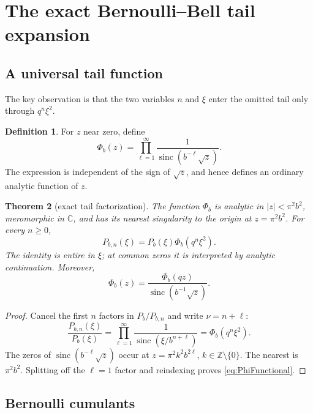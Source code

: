 \documentclass[11pt]{article}
\newtheorem{theorem}{Theorem}[section]
\theoremstyle{definition}
\newtheorem{definition}[theorem]{Definition}
\theoremstyle{remark}
\newcommand{\sinc}{\operatorname{sinc}}
\newcommand{\C}{\mathbb{C}}
\newcommand{\abs}[1]{\left\lvert #1\right\rvert}
\begin{document}
\section{The exact Bernoulli--Bell tail expansion}
\label{sec:tail}

\subsection{A universal tail function}

The key observation is that the two variables \(n\) and \(\xi\) enter the omitted
tail only through \(q^n\xi^2\).

\begin{definition}
For \(z\) near zero, define
\begin{equation}
 \Phi_b(z)=\prod_{\ell=1}^{\infty}
 \frac1{\sinc(b^{-\ell}\sqrt z)}.
 \label{eq:PhiDef}
\end{equation}
The expression is independent of the sign of \(\sqrt z\), and hence defines an
ordinary analytic function of \(z\).
\end{definition}

\begin{theorem}[exact tail factorization]
\label{thm:tailfactor}
The function \(\Phi_b\) is analytic in \(\abs z<\pi^2b^2\), meromorphic in
\(\C\), and has its nearest singularity to the origin at \(z=\pi^2b^2\). For
every \(n\geq0\),
\begin{equation}
 P_{b,n}(\xi)=P_b(\xi)\Phi_b(q^n\xi^2).
 \label{eq:exacttail}
\end{equation}
The identity is entire in \(\xi\); at common zeros it is interpreted by analytic
continuation. Moreover,
\begin{equation}
 \Phi_b(z)=\frac{\Phi_b(qz)}{\sinc(b^{-1}\sqrt z)}.
 \label{eq:PhiFunctional}
\end{equation}
\end{theorem}

\begin{proof}
Cancel the first \(n\) factors in \(P_b/P_{b,n}\) and write \(\nu=n+\ell\):
\[
 \frac{P_{b,n}(\xi)}{P_b(\xi)}
 =\prod_{\ell=1}^{\infty}
 \frac1{\sinc(\xi/b^{n+\ell})}
 =\Phi_b(q^n\xi^2).
\]
The zeros of \(\sinc(b^{-\ell}\sqrt z)\) occur at
\(z=\pi^2k^2b^{2\ell}\), \(k\in\mathbb Z\setminus\{0\}\). The nearest is
\(\pi^2b^2\). Splitting off the \(\ell=1\) factor and reindexing proves
\eqref{eq:PhiFunctional}.
\end{proof}

\subsection{Bernoulli cumulants}
\end{document}
